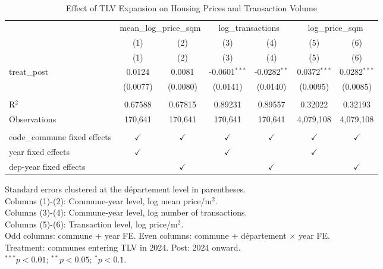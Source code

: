 
\begin{table}[htbp]
   \caption{\label{tab:main_did} Effect of TLV Expansion on Housing Prices and Transaction Volume}
   \bigskip
   \centering
   \begin{tabular}{lcccccc}
      \toprule
       & \multicolumn{2}{c}{mean\_log\_price\_sqm} & \multicolumn{2}{c}{log\_transactions} & \multicolumn{2}{c}{log\_price\_sqm}\\
                                   & (1)           & (2)           & (3)             & (4)            & (5)            & (6) \\   
                                   & (1)           & (2)           & (3)             & (4)            & (5)            & (6)\\  
      \midrule 
      treat\_post                  & 0.0124        & 0.0081        & -0.0601$^{***}$ & -0.0282$^{**}$ & 0.0372$^{***}$ & 0.0282$^{***}$\\   
                                   & (0.0077)      & (0.0080)      & (0.0141)        & (0.0140)       & (0.0095)       & (0.0085)\\   
       \\
      R$^2$                        & 0.67588       & 0.67815       & 0.89231         & 0.89557        & 0.32022        & 0.32193\\  
      Observations                 & 170,641       & 170,641       & 170,641         & 170,641        & 4,079,108      & 4,079,108\\  
       \\
      code\_commune fixed effects  & $\checkmark$  & $\checkmark$  & $\checkmark$    & $\checkmark$   & $\checkmark$   & $\checkmark$\\   
      year fixed effects           & $\checkmark$  &               & $\checkmark$    &                & $\checkmark$   & \\  
      dep-year fixed effects       &               & $\checkmark$  &                 & $\checkmark$   &                & $\checkmark$\\   
      \bottomrule
   \end{tabular}
   
   \par \raggedright 
   Standard errors clustered at the d\'epartement level in parentheses.\\
   Columns (1)-(2): Commune-year level, log mean price/m$^2$.\\
   Columns (3)-(4): Commune-year level, log number of transactions.\\
   Columns (5)-(6): Transaction level, log price/m$^2$.\\
   Odd columns: commune + year FE. Even columns: commune + d\'epartement $\times$ year FE.\\
   Treatment: communes entering TLV in 2024. Post: 2024 onward.\\
   $^{***}p<0.01$; $^{**}p<0.05$; $^{*}p<0.1$.
\end{table}


